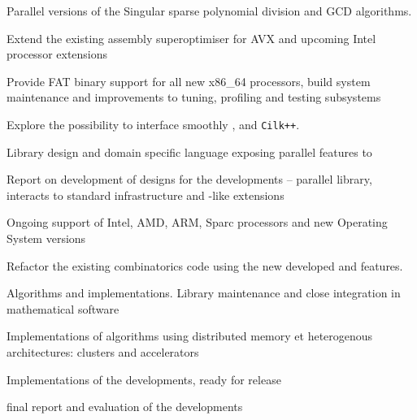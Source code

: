 \begin{workpackage}
\begin{wpdelivs}
\begin{wpdeliv}[due=12,id=singular-polyarith,dissem=PU,nature=DEM]
      {Parallel versions of the Singular sparse polynomial division and GCD algorithms.}
  \end{wpdeliv}
  \begin{wpdeliv}[due=12,id=MPIRsuperoptimiser,dissem=PU,nature=DEM]
      {Extend the existing assembly superoptimiser for AVX and upcoming Intel processor extensions}
  \end{wpdeliv}
  \begin{wpdeliv}[due=12,id=MPIRfat,dissem=PU,nature=DEM]
      {Provide FAT binary support for all new x86\_64 processors, build system maintenance and improvements to tuning, profiling and testing subsystems}
  \end{wpdeliv}
  \begin{wpdeliv}[due=12,id=HPCcombi,dissem=PU,nature=DEM]
      {Explore the possibility to interface smoothly \Pythran, \Cython and \texttt{Cilk++}.}
  \end{wpdeliv}
  \begin{wpdeliv}[due=12,id=LinBox-DSL,dissem=PU,nature=R,lead=UJF]
    {Library design and domain specific language exposing \Linbox parallel features to \Sage}
  \end{wpdeliv}
  \begin{wpdeliv}[due=18,id=GAP-hpc-report,dissem=PU,nature=R,lead=SA]
    {Report on development of designs for the \GAP developments --
      parallel library, interacts to standard infrastructure and
      \Cython-like extensions }
  \end{wpdeliv}
  \begin{wpdeliv}[due=24,id=MPIRprocessors,dissem=PU,nature=DEM]
      {Ongoing support of Intel, AMD, ARM, Sparc processors and new Operating System versions}
  \end{wpdeliv}
  \begin{wpdeliv}[due=24,id=HPCcombi,dissem=PU,nature=DEM]
      {Refactor the existing combinatorics \Sage code using the new developed \Pythran and \Cython features.}
  \end{wpdeliv}
  \begin{wpdeliv}[due=24,id=LinBox-algo,dissem=PU,nature=DEM, lead=UJF]
    {Algorithms and implementations. Library maintenance and close integration
      in mathematical software}
  \end{wpdeliv}
  \begin{wpdeliv}[due=36,id=LinBox-distributed,dissem=PU,nature=DEM, lead=UJF]
    {Implementations of algorithms using distributed memory et heterogenous
      architectures: clusters and accelerators}
  \end{wpdeliv}
  \begin{wpdeliv}[due=47,id=GAP-software-final,dissem=PU,nature=OTHER,lead=SA]
      {Implementations of the \GAP developments, ready for release}
  \end{wpdeliv}
  \begin{wpdeliv}[due=48,id=GAP-APIs-report,dissem=PU,nature=R,lead=SA]
      {final report and evaluation of the \GAP developments}
  \end{wpdeliv}
\end{wpdelivs}
\end{workpackage}
